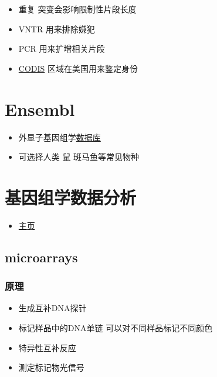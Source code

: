 \documentclass[]{book}
\providecommand{\tightlist}{%
  \setlength{\itemsep}{0pt}\setlength{\parskip}{0pt}}
\begin{document}
\begin{itemize}
\tightlist
\item
  重复 突变会影响限制性片段长度
\item
  VNTR 用来排除嫌犯
\item
  PCR 用来扩增相关片段
\item
  \href{http://www.fbi.gov/about-us/lab/biometric-analysis/codis}{CODIS} 区域在美国用来鉴定身份
\end{itemize}

\hypertarget{ensembl}{%
\section{Ensembl}\label{ensembl}}

\begin{itemize}
\tightlist
\item
  外显子基因组学\href{ensembl.org}{数据库}
\item
  可选择人类 鼠 斑马鱼等常见物种
\end{itemize}

\hypertarget{ux57faux56e0ux7ec4ux5b66ux6570ux636eux5206ux6790}{%
\section{基因组学数据分析}\label{ux57faux56e0ux7ec4ux5b66ux6570ux636eux5206ux6790}}

\begin{itemize}
\tightlist
\item
  \href{http://genomicsclass.github.io/book/}{主页}
\end{itemize}

\hypertarget{microarrays}{%
\subsection{microarrays}\label{microarrays}}

\hypertarget{ux539fux7406}{%
\subsubsection{原理}\label{ux539fux7406}}

\begin{itemize}
\tightlist
\item
  生成互补DNA探针
\item
  标记样品中的DNA单链 可以对不同样品标记不同颜色
\item
  特异性互补反应
\item
  测定标记物光信号
\end{itemize}
\end{document}
